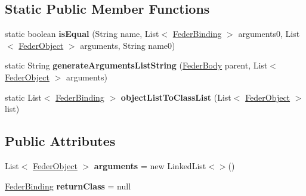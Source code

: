\subsection*{Static Public Member Functions}
\begin{DoxyCompactItemize}
\item 
\mbox{\label{classfeder_1_1types_1_1FederFunction_a84bebdf1ab2a7826143c07a2bc540186}} 
static boolean {\bfseries is\+Equal} (String name, List$<$ \hyperlink{classfeder_1_1types_1_1FederBinding}{Feder\+Binding} $>$ arguments0, List$<$ \hyperlink{classfeder_1_1types_1_1FederObject}{Feder\+Object} $>$ arguments, String name0)
\item 
\mbox{\label{classfeder_1_1types_1_1FederFunction_a9d1978ec4ec143c50579d6329e373487}} 
static String {\bfseries generate\+Arguments\+List\+String} (\hyperlink{classfeder_1_1types_1_1FederBody}{Feder\+Body} parent, List$<$ \hyperlink{classfeder_1_1types_1_1FederObject}{Feder\+Object} $>$ arguments)
\item 
\mbox{\label{classfeder_1_1types_1_1FederFunction_a7d5333bb3e4ea187c896f375a80375c3}} 
static List$<$ \hyperlink{classfeder_1_1types_1_1FederBinding}{Feder\+Binding} $>$ {\bfseries object\+List\+To\+Class\+List} (List$<$ \hyperlink{classfeder_1_1types_1_1FederObject}{Feder\+Object} $>$ list)
\end{DoxyCompactItemize}
\subsection*{Public Attributes}
\begin{DoxyCompactItemize}
\item 
\mbox{\label{classfeder_1_1types_1_1FederFunction_aee886e0bc02e05e89ab7d16e1306c5a2}} 
List$<$ \hyperlink{classfeder_1_1types_1_1FederObject}{Feder\+Object} $>$ {\bfseries arguments} = new Linked\+List$<$$>$()
\item 
\mbox{\label{classfeder_1_1types_1_1FederFunction_acf4385ff7373448369d64735967829ce}} 
\hyperlink{classfeder_1_1types_1_1FederBinding}{Feder\+Binding} {\bfseries return\+Class} = null
\end{DoxyCompactItemize}
